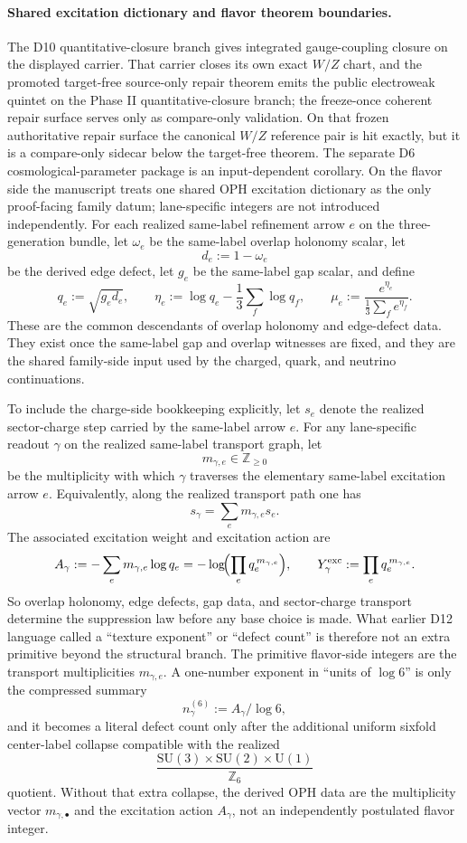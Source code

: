 \documentclass[11pt]{article}
\newcommand{\SU}{\mathrm{SU}}
\newcommand{\U}{\mathrm{U}}
\begin{document}
\paragraph{Shared excitation dictionary and flavor theorem boundaries.}
The D10 quantitative-closure branch gives integrated gauge-coupling closure on the displayed carrier. That carrier closes its own exact \(W/Z\) chart, and the promoted target-free source-only repair theorem emits the public electroweak quintet on the Phase II quantitative-closure branch; the freeze-once coherent repair surface serves only as compare-only validation. On that frozen authoritative repair surface the canonical \(W/Z\) reference pair is hit exactly, but it is a compare-only sidecar below the target-free theorem. The separate D6 cosmological-parameter package is an input-dependent corollary. On the flavor side the manuscript treats one shared OPH excitation dictionary as the only proof-facing family datum; lane-specific integers are not introduced independently. For each realized same-label refinement arrow \(e\) on the three-generation bundle, let \(\omega_e\) be the same-label overlap holonomy scalar, let
\[
d_e:=1-\omega_e
\]
be the derived edge defect, let \(g_e\) be the same-label gap scalar, and define
\[
q_e:=\sqrt{g_e d_e},
\qquad
\eta_e:=\log q_e-\frac13\sum_f \log q_f,
\qquad
\mu_e:=\frac{e^{\eta_e}}{\frac13\sum_f e^{\eta_f}}.
\]
These are the common descendants of overlap holonomy and edge-defect data. They exist once the same-label gap and overlap witnesses are fixed, and they are the shared family-side input used by the charged, quark, and neutrino continuations.

To include the charge-side bookkeeping explicitly, let \(s_e\) denote the realized sector-charge step carried by the same-label arrow \(e\). For any lane-specific readout \(\gamma\) on the realized same-label transport graph, let
\[
m_{\gamma,e}\in\mathbb Z_{\ge 0}
\]
be the multiplicity with which \(\gamma\) traverses the elementary same-label excitation arrow \(e\). Equivalently, along the realized transport path one has
\[
s_\gamma=\sum_e m_{\gamma,e}s_e.
\]
The associated excitation weight and excitation action are
\[
A_\gamma
:=
-\sum_e m_{\gamma,e}\log q_e
=
-\log\!\Bigl(\prod_e q_e^{\,m_{\gamma,e}}\Bigr),
\qquad
Y_\gamma^{\mathrm{exc}}
:=
\prod_e q_e^{\,m_{\gamma,e}}.
\]
So overlap holonomy, edge defects, gap data, and sector-charge transport determine the suppression law before any base choice is made. What earlier D12 language called a ``texture exponent'' or ``defect count'' is therefore not an extra primitive beyond the structural branch. The primitive flavor-side integers are the transport multiplicities \(m_{\gamma,e}\). A one-number exponent in ``units of \(\log 6\)'' is only the compressed summary
\[
n_\gamma^{(6)}:=A_\gamma/\log 6,
\]
and it becomes a literal defect count only after the additional uniform sixfold center-label collapse compatible with the realized
\[
\frac{\SU(3)\times\SU(2)\times\U(1)}{\mathbb Z_6}
\]
quotient. Without that extra collapse, the derived OPH data are the multiplicity vector \(m_{\gamma,\bullet}\) and the excitation action \(A_\gamma\), not an independently postulated flavor integer.
\end{document}
